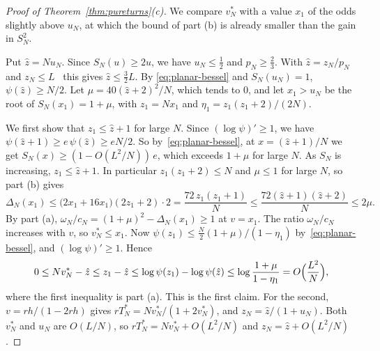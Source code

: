 \begin{proof}[Proof of Theorem~\ref{thm:pureturns}(c)]
We compare $v^*_N$ with a value $x_1$ of the odds slightly above $u_N$, at which the bound of
part (b) is already smaller than the gain in $S_N^2$.

Put $\hat z=Nu_N$. Since $S_N(u)\ge2u$, we have $u_N\le\frac12$ and $p_N\ge\frac23$. With
$\hat z=z_N/p_N$ and $z_N\le L$~\cite[Proposition~3.8]{paperA} this gives $\hat z\le\frac32L$. By
\eqref{eq:planar-bessel} and $S_N(u_N)=1$, $\psi(\hat z)\ge N/2$. Let $\mu=40(\hat z+2)^2/N$, which
tends to $0$, and let $x_1>u_N$ be the root of $S_N(x_1)=1+\mu$, with $z_1=Nx_1$ and
$\eta_1=z_1(z_1+2)/(2N)$.

We first show that $z_1\le \hat z+1$ for large $N$. Since $(\log\psi)'\ge1$, we have
$\psi(\hat z+1)\ge e\,\psi(\hat z)\ge eN/2$. So by~\eqref{eq:planar-bessel}, at $x=(\hat z+1)/N$ we get
$S_N(x)\ge(1-O(L^2/N))\,e$, which exceeds $1+\mu$ for large $N$. As $S_N$ is increasing,
$z_1\le \hat z+1$. In particular $z_1(z_1+2)\le N$ and $\mu\le1$ for large $N$, so part (b) gives
\[
 \Delta_N(x_1)\le\bigl(2x_1+16x_1\bigr)(2z_1+2)\cdot2=\frac{72\,z_1(z_1+1)}N
 \le\frac{72(\hat z+1)(\hat z+2)}N\le2\mu .
\]
By part (a), $\omega_N/c_N=(1+\mu)^2-\Delta_N(x_1)\ge1$ at $v=x_1$. The ratio $\omega_N/c_N$ increases
with $v$, so $v^*_N\le x_1$. Now $\psi(z_1)\le\frac N2(1+\mu)/(1-\eta_1)$
by~\eqref{eq:planar-bessel}, and $(\log\psi)'\ge1$. Hence
\[
 0\le Nv^*_N-\hat z\le z_1-\hat z\le\log\psi(z_1)-\log\psi(\hat z)\le\log\frac{1+\mu}{1-\eta_1}
 =O\Bigl(\frac{L^2}N\Bigr),
\]
where the first inequality is part (a). This is the first claim. For the second,
$v=rh/(1-2rh)$ gives $rT^*_N=Nv^*_N/(1+2v^*_N)$, and $z_N=\hat z/(1+u_N)$. Both $v^*_N$ and $u_N$ are
$O(L/N)$, so $rT^*_N=Nv^*_N+O(L^2/N)$ and $z_N=\hat z+O(L^2/N)$.
\end{proof}
